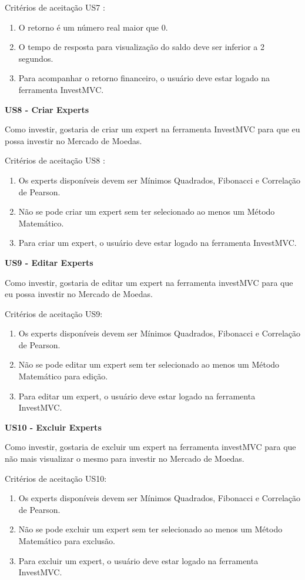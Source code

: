 Critérios de aceitação US7 :
\begin{enumerate}
\item O retorno é um número real maior que 0.
\item O tempo de resposta para visualização do saldo deve ser inferior a 2 segundos.
\item Para acompanhar o retorno financeiro, o usuário deve estar logado na ferramenta InvestMVC.
\end{enumerate}

\textbf{US8 - Criar Experts}

Como investir, gostaria de criar um expert na ferramenta InvestMVC para que eu possa investir no Mercado de Moedas.

Critérios de aceitação US8 :
\begin{enumerate}
\item Os experts disponíveis devem ser Mínimos Quadrados, Fibonacci e Correlação de Pearson.
\item Não se pode criar um expert sem ter selecionado ao menos um Método Matemático.
\item Para criar um expert, o usuário deve estar logado na ferramenta InvestMVC.
\end{enumerate}

\textbf{US9 - Editar Experts}

Como investir, gostaria de editar um expert na ferramenta investMVC para que eu possa investir no Mercado de Moedas.

Critérios de aceitação US9: 

\begin{enumerate}
\item Os experts disponíveis devem ser Mínimos Quadrados, Fibonacci e Correlação de Pearson.
\item Não se pode editar um expert sem ter selecionado ao menos um Método Matemático para edição.
\item Para editar um expert, o usuário deve estar logado na ferramenta InvestMVC.
\end{enumerate}

\textbf{US10 - Excluir Experts}

Como investir, gostaria de excluir um expert na ferramenta investMVC para que não mais visualizar o mesmo para investir no Mercado de Moedas.

Critérios de aceitação US10:
\begin{enumerate}
\item Os experts disponíveis devem ser Mínimos Quadrados, Fibonacci e Correlação de Pearson.
\item Não se pode excluir um expert sem ter selecionado ao menos um Método Matemático para exclusão.
\item Para excluir um expert, o usuário deve estar logado na ferramenta InvestMVC.
\end{enumerate}

